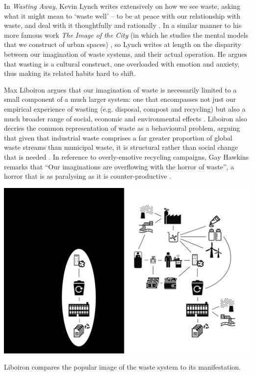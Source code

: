 \documentclass[nofonts,nols,justified,nobib]{tufte-book}
\begin{document}
In \emph{Wasting Away}\cite{lynch_wasting_1990}, Kevin Lynch writes extensively on how we see waste, asking what it might mean to `waste well' -- to be at peace with our relationship with waste, and deal with it thoughtfully and rationally . In a similar manner to his more famous work \emph{The Image of the City} (in which he studies the mental models that we construct of urban spaces) \cite{lynch_image_1960}, so Lynch writes at length on the disparity between our imagination of waste systems, and their actual operation. He argues that wasting is a cultural construct, one overloaded with emotion and anxiety, thus making its related habits hard to shift.


Max Liboiron argues that our imagination of waste is necessarily limited to a small component of a much larger system: one that encompasses not just our empirical experience of wasting (e.g. disposal, compost and recycling) but also a much broader range of social, economic and environmental effects \cite{liboiron_why_2014, liboiron_mapping_2014}. Liboiron also decries the common representation of waste as a behavioural problem, arguing that given that industrial waste comprises a far greater proportion of global waste streams than municipal waste, it is structural rather than social change that is needed \cite{liboiron_against_2014}. In reference to overly-emotive recycling campaigns, Gay Hawkins remarks that ``Our imaginations are overflowing with the horror of waste'', a horror that is as paralysing as it is counter-productive \cite{hawkins_ethics_2006}.

\begin{marginfigure}
\includegraphics[width=\textwidth]{img/1/waste-complexity.png}
\caption{Liboiron compares the popular image of the waste system to its manifestation. \cite{liboiron_why_2014}}
\end{marginfigure}
\end{document}
